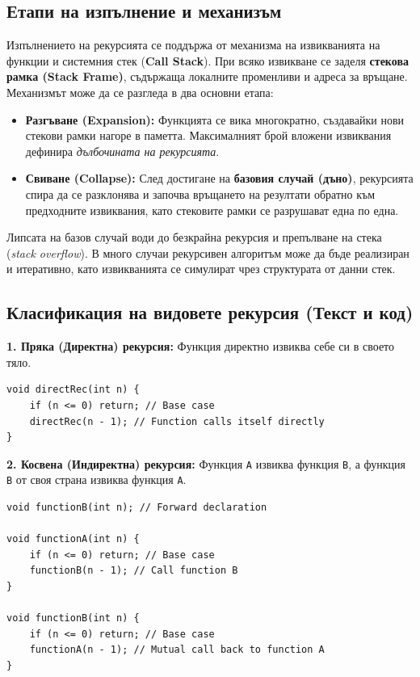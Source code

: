 \documentclass{scrartcl}
\begin{document}
\begin{FlushLeft}
\subsection{Етапи на изпълнение и механизъм}
Изпълнението на рекурсията се поддържа от механизма на извикванията на функции и системния стек (\textbf{Call Stack}). При всяко извикване се заделя \textbf{стекова рамка (Stack Frame)}, съдържаща локалните променливи и адреса за връщане. Механизмът може да се разгледа в два основни етапа:
\begin{itemize}
    \item \textbf{Разгъване (Expansion):} Функцията се вика многократно, създавайки нови стекови рамки нагоре в паметта. Максималният брой вложени извиквания дефинира \textit{дълбочината на рекурсията}.
    \item \textbf{Свиване (Collapse):} След достигане на \textbf{базовия случай (дъно)}, рекурсията спира да се разклонява и започва връщането на резултати обратно към предходните извиквания, като стековите рамки се разрушават една по една.
\end{itemize}
Липсата на базов случай води до безкрайна рекурсия и препълване на стека (\textit{stack overflow}). В много случаи рекурсивен алгоритъм може да бъде реализиран и итеративно, като извикванията се симулират чрез структурата от данни стек.

\subsection{Класификация на видовете рекурсия (Текст и код)}

\textbf{1. Пряка (Директна) рекурсия:} Функция директно извиква себе си в своето тяло.
\begin{lstlisting}
void directRec(int n) {
    if (n <= 0) return; // Base case
    directRec(n - 1); // Function calls itself directly
}
\end{lstlisting}

\textbf{2. Косвена (Индиректна) рекурсия:} Функция \texttt{A} извиква функция \texttt{B}, а функция \texttt{B} от своя страна извиква функция \texttt{A}.
\begin{lstlisting}
void functionB(int n); // Forward declaration

void functionA(int n) {
    if (n <= 0) return; // Base case
    functionB(n - 1); // Call function B
}

void functionB(int n) {
    if (n <= 0) return; // Base case
    functionA(n - 1); // Mutual call back to function A
}
\end{lstlisting}


\end{FlushLeft}
\end{document}
